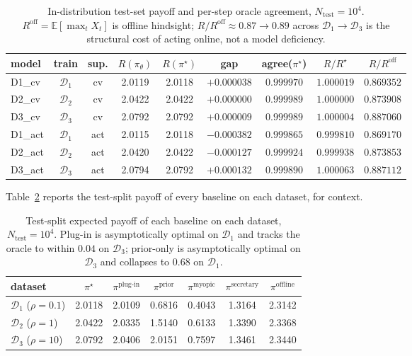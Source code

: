 \documentclass[11pt]{article}
\begin{document}
\begin{table}[H]
\centering
\small
\begin{tabular}{l c c c c c c c c}
\hline
model & train & sup. & $R(\pi_\theta)$ & $R(\pi^\star)$ & gap & agree($\pi^\star$) & $R/R^\star$ & $R/R^{\mathrm{off}}$ \\
\hline
D1\_cv  & $\mathcal{D}_1$ & cv  & 2.0119 & 2.0118 & $+0.000038$ & $0.999970$ & $1.000019$ & $0.869352$ \\
D2\_cv  & $\mathcal{D}_2$ & cv  & 2.0422 & 2.0422 & $+0.000000$ & $0.999989$ & $1.000000$ & $0.873908$ \\
D3\_cv  & $\mathcal{D}_3$ & cv  & 2.0792 & 2.0792 & $+0.000009$ & $0.999989$ & $1.000004$ & $0.887060$ \\
D1\_act & $\mathcal{D}_1$ & act & 2.0115 & 2.0118 & $-0.000382$ & $0.999865$ & $0.999810$ & $0.869170$ \\
D2\_act & $\mathcal{D}_2$ & act & 2.0420 & 2.0422 & $-0.000127$ & $0.999924$ & $0.999938$ & $0.873853$ \\
D3\_act & $\mathcal{D}_3$ & act & 2.0794 & 2.0792 & $+0.000132$ & $0.999890$ & $1.000063$ & $0.887112$ \\
\hline
\end{tabular}
\caption{In-distribution test-set payoff and per-step oracle agreement, $N_{\mathrm{test}} = 10^4$. $R^{\mathrm{off}} = \mathbb{E}[\max_t X_t]$ is offline hindsight; $R/R^{\mathrm{off}} \approx 0.87 \to 0.89$ across $\mathcal{D}_1 \to \mathcal{D}_3$ is the structural cost of acting online, not a model deficiency.}
\label{tab:indist}
\end{table}

Table~\ref{tab:baselines} reports the test-split payoff of every baseline on each dataset, for context.

\begin{table}[H]
\centering
\small
\begin{tabular}{l c c c c c c}
\hline
dataset & $\pi^\star$ & $\pi^{\mathrm{plug\text{-}in}}$ & $\pi^{\mathrm{prior}}$ & $\pi^{\mathrm{myopic}}$ & $\pi^{\mathrm{secretary}}$ & $\pi^{\mathrm{offline}}$ \\
\hline
$\mathcal{D}_1$ ($\rho = 0.1$) & 2.0118 & 2.0109 & 0.6816 & 0.4043 & 1.3164 & 2.3142 \\
$\mathcal{D}_2$ ($\rho = 1$)   & 2.0422 & 2.0335 & 1.5140 & 0.6133 & 1.3390 & 2.3368 \\
$\mathcal{D}_3$ ($\rho = 10$)  & 2.0792 & 2.0406 & 2.0151 & 0.7597 & 1.3461 & 2.3440 \\
\hline
\end{tabular}
\caption{Test-split expected payoff of each baseline on each dataset, $N_{\mathrm{test}} = 10^4$. Plug-in is asymptotically optimal on $\mathcal{D}_1$ and tracks the oracle to within $0.04$ on $\mathcal{D}_3$; prior-only is asymptotically optimal on $\mathcal{D}_3$ and collapses to $0.68$ on $\mathcal{D}_1$.}
\label{tab:baselines}
\end{table}
\end{document}

